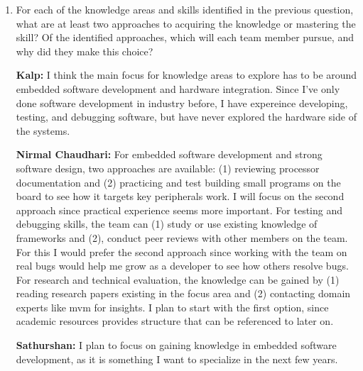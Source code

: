 \begin{enumerate}
  \item For each of the knowledge areas and skills identified in the previous
  question, what are at least two approaches to acquiring the knowledge or
  mastering the skill?  Of the identified approaches, which will each team
  member pursue, and why did they make this choice?

  \textbf{Kalp:} I think the main focus for knowledge areas to explore has to be
  around embedded software development and hardware integration. Since I've only
  done software development in industry before, I have expereince developing, 
  testing, and debugging software, but have never explored the hardware side of
  the systems. 

  \textbf{Nirmal Chaudhari:} For embedded software development and strong 
  software design, two approaches are available: (1) reviewing processor 
  documentation and (2) practicing and test building small programs on the 
  board to see how it targets key peripherals work. I will focus on the second 
  approach since practical experience seems more important. For testing and 
  debugging skills, the team can (1) study or use existing knowledge of 
  frameworks and (2), conduct peer reviews with other members on the team. 
  For this I would prefer the second approach since working with the team 
  on real bugs would help me grow as a developer to see how others resolve bugs.
  For research and technical evaluation, the knowledge can be gained by (1) 
  reading research papers existing in the focus area and (2) contacting domain 
  experts like mvm for insights. I plan to start with the first option, 
  since academic resources provides structure that can be referenced to later on.
 
  \textbf{Sathurshan:} I plan to focus on gaining knowledge in embedded software
  development, as it is something I want to specialize in the next few years.

\end{enumerate}

